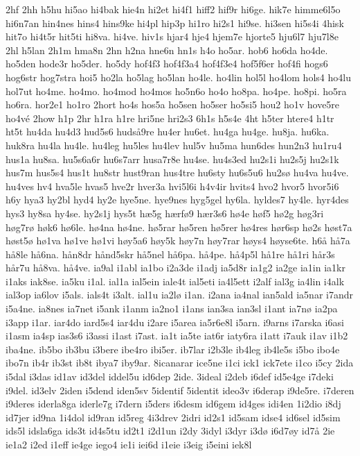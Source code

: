 {2hf
2hh
h5hu
hi5ao
hi4bak
hie4n
hi2et
hi4f1
hiff2
hif9r
hi6ge.
hik7e
himme6l5o
hi6n7an
hin4nes
hins4
hins9ke
hi4pl
hip3p
hi1ro
hi2s1
hi9se.
hi3sen
hi5s4i
4hisk
hit7o
hi4t5r
hit5ti
hi8va.
hi4ve.
hiv1s
hjar4
hje4
hjem7e
hjorte5
hju6l7
hju7l8e
2hl
h5lan
2h1m
hma8n
2hn
h2na
hne6n
hn1s
h4o
ho5ar.
hob6
ho6da
ho4de.
ho5den
hode3r
ho5der.
ho5dy
hof4f3
hof4f3a4
hof4f3e4
hof5f6er
hof4fi
hogs6
hog6str
hog7stra
hoi5
ho2la
ho5lag
ho5lan
ho4le.
ho4lin
hol5l
ho4lom
hols4
ho4lu
hol7ut
ho4me.
ho4mo.
ho4mod
ho4mos
ho5n6o
ho4o
ho8pa.
ho4pe.
ho8pi.
ho5ra
ho6ra.
hor2e1
ho1ro
2hort
ho4s
hos5a
ho5sen
ho5ser
ho5si5
hou2
ho1v
hove5re
ho4vé
2how
h1p
2hr
h1ra
h1re
hri5ne
hri2s3
6h1s
h5s4e
4ht
h5ter
htere4
h1tr
ht5t
hu4da
hu4d3
hud5s6
hudså9re
hu4er
hu6et.
hu4ga
hu4ge.
hu8ja.
hu6ka.
huk8ra
hu4la
hu4le.
hu4leg
hu5les
hu4lev
hul5v
hu5ma
hun6des
hun2n3
hu1ru4
hus1a
hu8sa.
hu5s6a6r
hu6s7arr
husa7r8e
hu4se.
hu4s3ed
hu2s1i
hu2s5j
hu2s1k
hus7m
hus5s4
hus1t
hu8str
hust9ran
hus4tre
hu6sty
hu6s5u6
hu2sø
hu4va
hu4ve.
hu4ves
hv4
hva5le
hvas5
hve2r
hver3a
hvi5l6i
h4v4ir
hvits4
hvo2
hvor5
hvor5i6
h6y
hya3
hy2bl
hyd4
hy2e
hye5ne.
hye9nes
hyg5gel
hy6la.
hyldes7
hy4le.
hyr4des
hys3
hy8sa
hy4se.
hy2s1j
hys5t
hæ5g
hærfø9
hær3s6
hø4e
høf5
hø2g
høg3ri
høg7rø
høk6
hø6le.
hø4na
hø4ne.
hø5rar
hø5ren
hø5rer
hø4res
hør6sp
hø2s
høst7a
høst5ø
hø1va
hø1ve
hø1vi
høy5a6
høy5k
høy7n
høy7rar
høys4
høyse6te.
h6å
hå7a
hå8le
hå6na.
hån8dr
hånd5skr
hå5nel
hå6pa.
hå4pe.
hå4p5l
hå1re
hå1ri
hår3s
hår7u
hå8va.
hå4ve.
ia9al
i1abl
ia1bo
i2a3de
i1adj
ia5d8r
ia1g2
ia2ge
ia1in
ia1kr
i1aks
iak8se.
ia5ku
i1al.
ial1a
ial5ein
iale4t
ial5eti
ia4l5ett
i2alf
ial3g
ia4lin
i4alk
ial3op
ia6lov
i5als.
ials4t
i3alt.
ial1u
ia2lø
i1an.
i2ana
ia4nal
ian5ald
ia5nar
i7andr
i5a4ne.
ia8nes
ia7net
i5ank
i1anm
ia2no1
i1ans
ian3sa
ian3sl
i1ant
ia7nø
ia2pa
i3app
i1ar.
iar4do
iard5s4
iar4du
i2are
i5area
ia5r6e8l
i5arn.
i9arns
i7arska
i6asi
i1asm
ia4sp
ias3s6
i3assi
i1ast
i7ast.
ia1t
ia5te
iat6r
iaty6ra
i1att
i7auk
i1av
i1b2
iba4ne.
ib5bo
ib3bu
i3bere
ibe4ro
ibi5er.
ib7lar
i2b3le
ib4leg
ib4le5s
i5bo
ibo4e
ibo7n
ib4r
ib3st
ib8t
ibya7
iby9ar.
8icanarar
ice5ne
i1ci
ick1
ick7ete
i1co
i5cy
2ida
i5dal
i3das
id1av
id3del
iddel5u
id6dep
2ide.
3ideal
i2deb
i6def
id5e4ge
i7deki
i9del.
id3elv
2iden
i5dend
iden5sv
5identif
5identit
ideo3v
i6derap
i9de5re.
i7deren
i9deres
iderla8ga
iderle7g
i7dern
i5ders
i6desm
id6gem
id4ges
idi4en
1i2dio
i8dj
id7jer
id9na
1i4dol
id9ran
id5reg
4i3drev
2idri
id2s1
id5sam
idse4
id6sel
id5sim
ids5l
idsla6ga
ids3t
id4s5tu
id2t1
i2d1un
i2dy
3idyl
i3dyr
i3dø
i6d7øy
id7å
2ie
ie1a2
i2ed
i1eff
ie4ge
iego4
ie1i
iei6d
i1eie
i3eig
i5eini
iek8l
}
